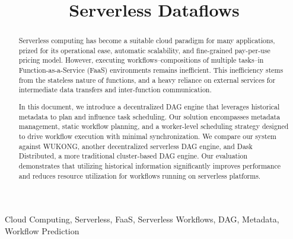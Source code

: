 \documentclass[conference]{IEEEtran}
\begin{document}
\title{Serverless Dataflows}

\author{
\and
{}
}
\maketitle

\begin{abstract}
Serverless computing has become a suitable cloud paradigm for many applications, prized for its operational ease, automatic scalability, and fine-grained pay-per-use pricing model. However, executing workflows--compositions of multiple tasks--in Function-as-a-Service (FaaS) environments remains inefficient. This inefficiency stems from the stateless nature of functions, and a heavy reliance on external services for intermediate data transfers and inter-function communication.

In this document, we introduce a decentralized DAG engine that leverages historical metadata to plan and influence task scheduling. Our solution encompasses metadata management, static workflow planning, and a worker-level scheduling strategy designed to drive workflow execution with minimal synchronization. We compare our system against WUKONG, another decentralized serverless DAG engine, and Dask Distributed, a more traditional cluster-based DAG engine. Our evaluation demonstrates that utilizing historical information significantly improves performance and reduces resource utilization for workflows running on serverless platforms.
\end{abstract}

\begin{IEEEkeywords}
Cloud Computing, Serverless, FaaS, Serverless Workflows, DAG, Metadata, Workflow Prediction
\end{IEEEkeywords}
\end{document}
